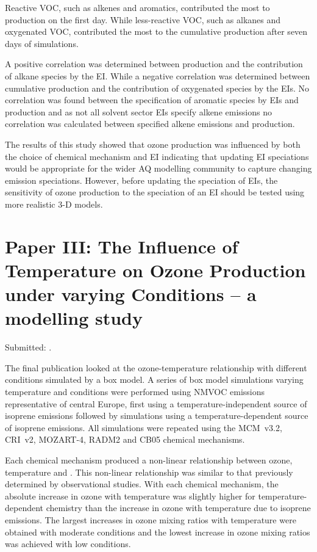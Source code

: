 Reactive VOC, such as alkenes and aromatics, contributed the most to  production on the first day.
While less-reactive VOC, such as alkanes and oxygenated VOC, contributed the most to the cumulative  production after seven days of simulations. 

A positive correlation was determined between  production and the contribution of alkane species by the EI.
While a negative correlation was determined between cumulative  production and the contribution of oxygenated species by the EIs.
No correlation was found between the specification of aromatic species by EIs and  production and as not all solvent sector EIs specify alkene emissions no correlation was calculated between specified alkene emissions and  production.

The results of this study showed that ozone production was influenced by both the choice of chemical mechanism and EI indicating that updating EI speciations would be appropriate for the wider AQ modelling community to capture changing emission speciations.
However, before updating the speciation of EIs, the sensitivity of ozone production to the speciation of an EI should be tested using more realistic 3-D models.

\singlespacing
\section{Paper III: The Influence of Temperature on Ozone Production under varying  Conditions -- a modelling study} \label{s:T-O3_results}
\onehalfspacing

\noindent
Submitted: .

The final publication looked at the ozone-temperature relationship with different  conditions simulated by a box model.
A series of box model simulations varying temperature and  conditions were performed using NMVOC emissions representative of central Europe, first using a temperature-independent source of isoprene emissions followed by simulations using a temperature-dependent source of isoprene emissions.
All simulations were repeated using the MCM~v3.2, CRI~v2, MOZART-4, RADM2 and CB05 chemical mechanisms.

Each chemical mechanism produced a non-linear relationship between ozone, temperature and .
This non-linear relationship was similar to that previously determined by observational studies.  
With each chemical mechanism, the absolute increase in ozone with temperature was slightly higher for temperature-dependent chemistry than the increase in ozone with temperature due to isoprene emissions.
The largest increases in ozone mixing ratios with temperature were obtained with moderate  conditions and the lowest increase in ozone mixing ratios was achieved with low  conditions.

